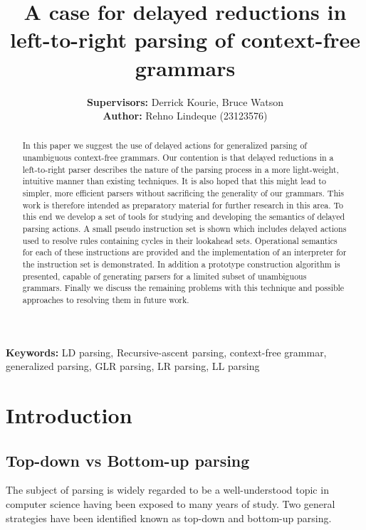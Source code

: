 \documentclass[a4paper,11pt]{article}
\begin{document}
\title{A case for delayed reductions in left-to-right parsing of context-free grammars}
\author{\textbf{Supervisors:} Derrick Kourie, Bruce Watson\\
\textbf{Author:} Rehno Lindeque (23123576)}

\maketitle

\begin{abstract}
In this paper we suggest the use of delayed actions for generalized parsing of unambiguous context-free grammars. 
Our contention is that delayed reductions in a left-to-right parser describes the nature of the parsing process in a more light-weight, intuitive manner than existing techniques.
It is also hoped that this might lead to simpler, more efficient parsers without sacrificing the generality of our grammars.
This work is therefore intended as preparatory material for further research in this area.
To this end we develop a set of tools for studying and developing the semantics of delayed parsing actions.
A small pseudo instruction set is shown which includes delayed actions used to resolve rules containing cycles in their lookahead sets.
Operational semantics for each of these instructions are provided and the implementation of an interpreter for the instruction set is demonstrated.
In addition a prototype construction algorithm is presented, capable of generating parsers for a limited subset of unambiguous grammars.
Finally we discuss the remaining problems with this technique and possible approaches to resolving them in future work.\\
\end{abstract}

\textbf{Keywords:} LD parsing, Recursive-ascent parsing, context-free grammar, generalized parsing, GLR parsing, LR parsing, LL parsing

\section{Introduction}

\subsection{Top-down vs Bottom-up parsing}

The subject of parsing is widely regarded to be a well-understood topic in computer science having been exposed to many years of study.
Two general strategies have been identified known as top-down and bottom-up parsing.\\
\end{document}
